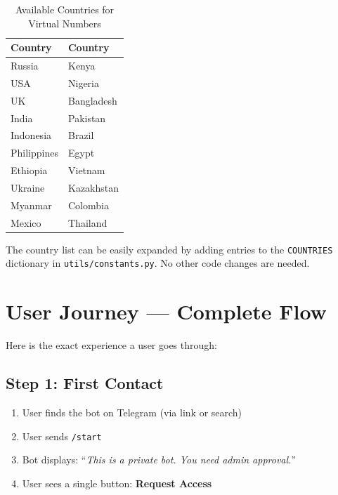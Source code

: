 \begin{table}[H]
\centering
\caption{Available Countries for Virtual Numbers}
\begin{tabular}{|l||l|}
\hline
\textbf{Country} & \textbf{Country} \\
\hline
Russia & Kenya \\
USA & Nigeria \\
UK & Bangladesh \\
India & Pakistan \\
Indonesia & Brazil \\
Philippines & Egypt \\
Ethiopia & Vietnam \\
Ukraine & Kazakhstan \\
Myanmar & Colombia \\
Mexico & Thailand \\
\hline
\end{tabular}
\end{table}

\begin{tipbox}
The country list can be easily expanded by adding entries to the \texttt{COUNTRIES} dictionary in \texttt{utils/constants.py}. No other code changes are needed.
\end{tipbox}

\section{User Journey — Complete Flow}

Here is the exact experience a user goes through:

\subsection{Step 1: First Contact}
\begin{enumerate}
    \item User finds the bot on Telegram (via link or search)
    \item User sends \texttt{/start}
    \item Bot displays: ``\textit{This is a private bot. You need admin approval.}''
    \item User sees a single button: \textbf{Request Access}
\end{enumerate}

